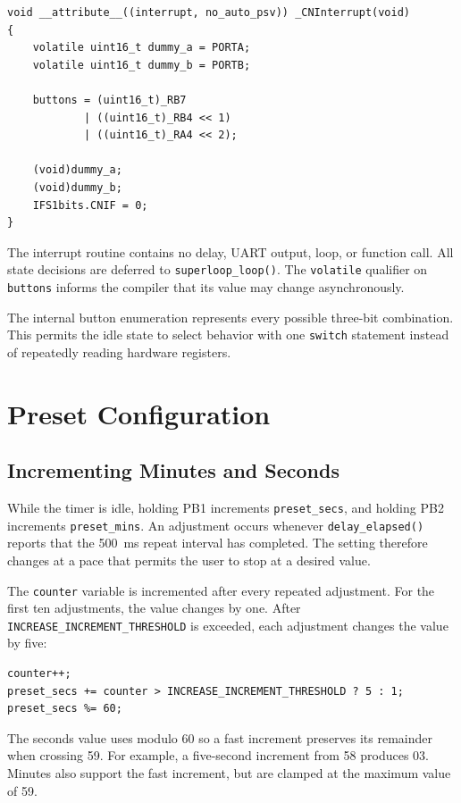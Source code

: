 \documentclass[11pt]{article}
\newcommand{\code}[1]{\texttt{#1}}
\begin{document}
\begin{verbatim}
void __attribute__((interrupt, no_auto_psv)) _CNInterrupt(void)
{
    volatile uint16_t dummy_a = PORTA;
    volatile uint16_t dummy_b = PORTB;

    buttons = (uint16_t)_RB7
            | ((uint16_t)_RB4 << 1)
            | ((uint16_t)_RA4 << 2);

    (void)dummy_a;
    (void)dummy_b;
    IFS1bits.CNIF = 0;
}
\end{verbatim}

The interrupt routine contains no delay, UART output, loop, or function call. All state decisions are deferred to \code{superloop\_loop()}. The \code{volatile} qualifier on \code{buttons} informs the compiler that its value may change asynchronously.

The internal button enumeration represents every possible three-bit combination. This permits the idle state to select behavior with one \code{switch} statement instead of repeatedly reading hardware registers.

\section{Preset Configuration}

\subsection{Incrementing Minutes and Seconds}

While the timer is idle, holding PB1 increments \code{preset\_secs}, and holding PB2 increments \code{preset\_mins}. An adjustment occurs whenever \code{delay\_elapsed()} reports that the 500~ms repeat interval has completed. The setting therefore changes at a pace that permits the user to stop at a desired value.

The \code{counter} variable is incremented after every repeated adjustment. For the first ten adjustments, the value changes by one. After \code{INCREASE\_INCREMENT\_THRESHOLD} is exceeded, each adjustment changes the value by five:

\begin{verbatim}
counter++;
preset_secs += counter > INCREASE_INCREMENT_THRESHOLD ? 5 : 1;
preset_secs %= 60;
\end{verbatim}

The seconds value uses modulo 60 so a fast increment preserves its remainder when crossing 59. For example, a five-second increment from 58 produces 03. Minutes also support the fast increment, but are clamped at the maximum value of 59.
\end{document}
